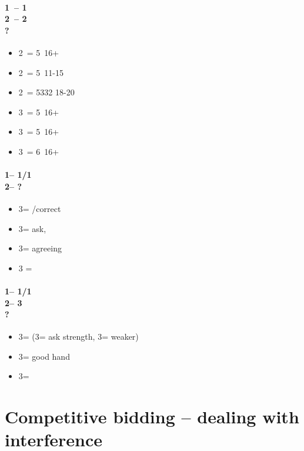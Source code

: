 \subsubsection*{1\spades\ -- 1\ntx\ \\ 2\clubs\ -- 2\diams \\ ?}
\begin{itemize}
    \item 2\hearts\ = 5\hearts\ 16+
    \item 2\spades\ = 5\clubs\ 11-15
    \item 2\ntx\ = 5332 18-20
    \item 3\clubs\ = 5\clubs\ 16+
    \item 3\diams\ = 5\diams\ 16+
    \item 3\spades\ = 6\spades\ 16+
\end{itemize}

\subsubsection*{1\major -- 1\spades/1\nt\\
                2\nt -- ?}
\begin{itemize}
    \item 3\clubs = \pass/correct
    \item 3\diams = ask, \gf
    \item 3\major = agreeing \major
    \item 3\twosuit{\spades}{\hearts} = \nat
\end{itemize}

\subsubsection*{1\major -- 1\spades/1\nt\\
                2\nt -- 3\diams\\
                ?}
\begin{itemize}
    \item 3\hearts = \clubs (3\spades = ask strength, 3\nt = weaker)
    \item 3\spades = \diams good hand
    \item 3\nt = \diams
\end{itemize}

\chapter{Competitive bidding -- dealing with interference}\label{chap:competitive}
